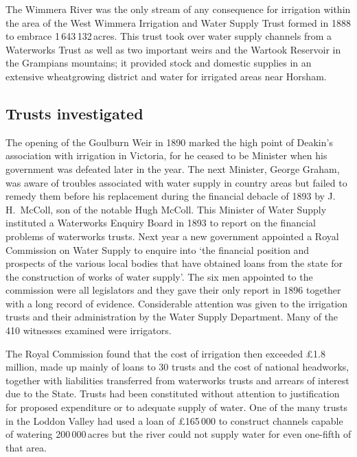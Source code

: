 The Wimmera River  was the only stream of any
consequence for irrigation within the area of the West Wimmera
Irrigation and Water Supply Trust  formed in 1888 to embrace 1\,643\,132\,acres. This trust took
over water supply channels from a Waterworks Trust as well as two
important weirs and the Wartook Reservoir  in
the Grampians mountains; it provided stock and domestic supplies in an
extensive wheatgrowing district and water for irrigated areas near
Horsham. 

\subsection*{Trusts investigated}

The opening of the Goulburn Weir  in 1890 marked
the high point of Deakin's  association with
irrigation in Victoria, for he ceased to be Minister when his
government was defeated later in the year.  The next Minister, George
Graham,  was aware of troubles associated with water
supply in country areas but failed to remedy them before his
replacement during the financial debacle of 1893 by J.\,H.~McColl,
 son
of the notable Hugh McColl.  This Minister of Water Supply instituted
a Waterworks Enquiry Board in 1893 to report on the financial problems
of waterworks trusts.  Next year a new government appointed a Royal
Commission on Water Supply  to enquire into `the financial position and prospects of the
various local bodies that have obtained loans from the state for the
construction of works of water supply'. The six men appointed to the
commission were all legislators and they gave their only report in
1896 together with a long record of evidence.  Considerable attention
was given to the irrigation trusts and their administration by the
Water Supply Department.  Many of the 410 witnesses examined were
irrigators.

The Royal Commission found that the cost of irrigation then exceed\-ed
\pounds1.8 million, made up mainly of loans to 30 trusts and the cost of
national headworks, together with liabilities transferred from
waterworks trusts and arrears of interest due to the State.  Trusts
had been constituted without attention to justification for proposed
expenditure or to adequate supply of water.  One of the many trusts in
the Loddon Valley  had used a loan of
\pounds165\,000 to construct channels capable of watering 200\,000\,acres
but the river could not supply water for even one-fifth of that
area.

